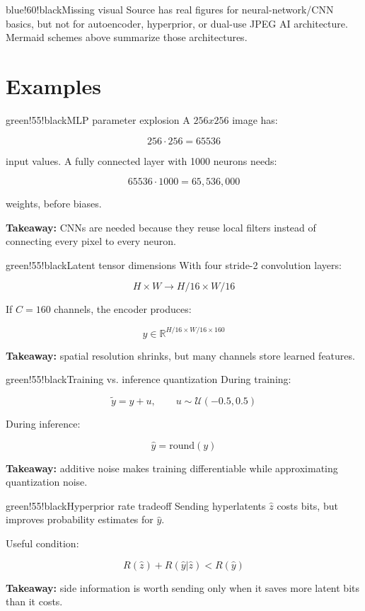 \begin{calloutbox}{blue!60!black}{Missing visual}
Source has real figures for neural-network/CNN basics, but not for autoencoder, hyperprior, or dual-use JPEG AI architecture. Mermaid schemes above summarize those architectures.
\end{calloutbox}

\section{Examples}

\begin{calloutbox}{green!55!black}{MLP parameter explosion}
A $256x256$ image has:

\[
256\cdot256=65536
\]

input values. A fully connected layer with 1000 neurons needs:

\[
65536\cdot1000=65,536,000
\]

weights, before biases.

\textbf{Takeaway:} CNNs are needed because they reuse local filters instead of connecting every pixel to every neuron.
\end{calloutbox}

\begin{calloutbox}{green!55!black}{Latent tensor dimensions}
With four stride-2 convolution layers:

\[
H\times W\rightarrow H/16\times W/16
\]

If $C=160$ channels, the encoder produces:

\[
y\in\mathbb{R}^{H/16\times W/16\times160}
\]

\textbf{Takeaway:} spatial resolution shrinks, but many channels store learned features.
\end{calloutbox}

\begin{calloutbox}{green!55!black}{Training vs. inference quantization}
During training:

\[
\tilde{y}=y+u,\qquad u\sim\mathcal{U}(-0.5,0.5)
\]

During inference:

\[
\hat{y}=\mathrm{round}(y)
\]

\textbf{Takeaway:} additive noise makes training differentiable while approximating quantization noise.
\end{calloutbox}

\begin{calloutbox}{green!55!black}{Hyperprior rate tradeoff}
Sending hyperlatents $\hat{z}$ costs bits, but improves probability estimates for $\hat{y}$.

Useful condition:

\[
R(\hat{z})+R(\hat{y}|\hat{z}) < R(\hat{y})
\]

\textbf{Takeaway:} side information is worth sending only when it saves more latent bits than it costs.
\end{calloutbox}

